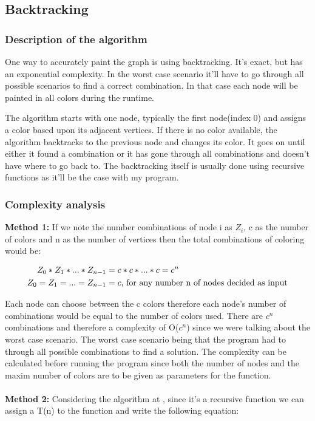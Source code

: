 \documentclass[runningheads]{llncs}
\begin{document}
\subsection{Backtracking}
\subsubsection{Description of the algorithm}
One way to accurately paint the graph is using backtracking. It's exact, but has an exponential complexity.
In the worst case scenario it'll have to go through all possible scenarios to find a correct combination.
In that case each node will be painted in all colors during the runtime.

The algorithm starts with one node, typically the first node(index 0) and assigns a color based upon its
adjacent vertices. If there is no color available, the algorithm backtracks to the previous node and
changes its color. It goes on until either it found a combination or it has gone through all combinations
and doesn't have where to go back to. The backtracking itself is usually done using recursive functions
as it'll be the case with my program.\cite{ref_url2}
\subsubsection{Complexity analysis}
\vspace{10em}
\textbf{Method 1: }If we note the number combinations of
node i as $Z_i$, c as the number of colors and n as the number of vertices then the total combinations of
coloring would be:

\begin{align*}
Z_0 * Z_1 * ... * Z_{n-1} &= c * c * ... * c = c^n \\
Z_0 = Z_1 = ... = Z_{n-1} &= c \textnormal{, for any number n of nodes decided as input}
\end{align*}

Each node can choose between the c colors therefore each node's number of combinations would be equal to
the number of colors used. There are $c^n$ combinations and therefore a complexity of O($c^n$) since we were talking about the worst case scenario.
The worst case scenario being that the program had to through all possible combinations to find a
solution.
The complexity can be calculated before running the program since both the number of nodes and the maxim
number of colors are to be given as parameters for the function.
\\
\\
\textbf{Method 2: }
Considering the algorithm at \cite{ref_url2}, since it's a recursive function we can assign a T(n) to
the function and write the following equation:
\end{document}

